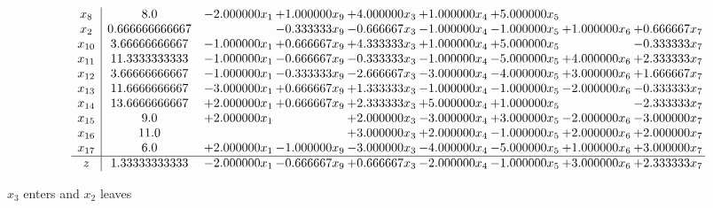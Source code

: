 \documentclass[10pt]{article}
\begin{document}
 \[\begin{array}{c| c c@{\hskip 2pt} c@{\hskip 2pt} c@{\hskip 2pt} c@{\hskip 2pt} c@{\hskip 2pt} c@{\hskip 2pt} c@{\hskip 2pt} }
 x_{8}   &  8.0 & -2.000000 x_{1} & + 1.000000 x_{9} & + 4.000000 x_{3} & + 1.000000 x_{4} & + 5.000000 x_{5} &    &   \\
 x_{2}   &  0.666666666667  &   & -0.333333 x_{9} & -0.666667 x_{3} & -1.000000 x_{4} & -1.000000 x_{5} & + 1.000000 x_{6} & + 0.666667 x_{7}\\
 x_{10}   &  3.66666666667 & -1.000000 x_{1} & + 0.666667 x_{9} & + 4.333333 x_{3} & + 1.000000 x_{4} & + 5.000000 x_{5} &   & -0.333333 x_{7}\\
 x_{11}   &  11.3333333333 & -1.000000 x_{1} & -0.666667 x_{9} & -0.333333 x_{3} & -1.000000 x_{4} & -5.000000 x_{5} & + 4.000000 x_{6} & + 2.333333 x_{7}\\
 x_{12}   &  3.66666666667 & -1.000000 x_{1} & -0.333333 x_{9} & -2.666667 x_{3} & -3.000000 x_{4} & -4.000000 x_{5} & + 3.000000 x_{6} & + 1.666667 x_{7}\\
 x_{13}   &  11.6666666667 & -3.000000 x_{1} & + 0.666667 x_{9} & + 1.333333 x_{3} & -1.000000 x_{4} & -1.000000 x_{5} & -2.000000 x_{6} & -0.333333 x_{7}\\
 x_{14}   &  13.6666666667 & + 2.000000 x_{1} & + 0.666667 x_{9} & + 2.333333 x_{3} & + 5.000000 x_{4} & + 1.000000 x_{5} &   & -2.333333 x_{7}\\
 x_{15}   &  9.0 & + 2.000000 x_{1} &   & + 2.000000 x_{3} & -3.000000 x_{4} & + 3.000000 x_{5} & -2.000000 x_{6} & -3.000000 x_{7}\\
 x_{16}   &  11.0  &    &   & + 3.000000 x_{3} & + 2.000000 x_{4} & -1.000000 x_{5} & + 2.000000 x_{6} & + 2.000000 x_{7}\\
 x_{17}   &  6.0 & + 2.000000 x_{1} & -1.000000 x_{9} & -3.000000 x_{3} & -4.000000 x_{4} & -5.000000 x_{5} & + 1.000000 x_{6} & + 3.000000 x_{7}\\
\hline
z    &  1.33333333333 & -2.000000 x_{1} & -0.666667 x_{9} & + 0.666667 x_{3} & -2.000000 x_{4} & -1.000000 x_{5} & + 3.000000 x_{6} & + 2.333333 x_{7}\\
\end{array}\]


 $ x_{3} $ enters and $ x_{2} $ leaves 
\end{document}
